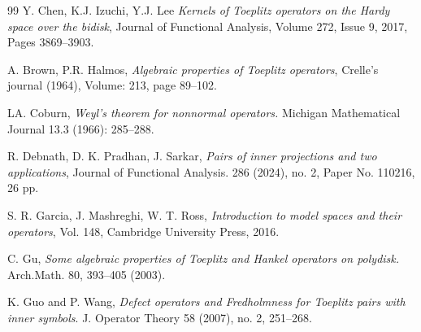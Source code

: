 \documentclass[12pt, a4 paper]{amsart}
\theoremstyle{definition}
\theoremstyle{plain}
\theoremstyle{definition}
\numberwithin{equation}{section}
\begin{document}
\begin{thebibliography}{99}
Y. Chen, K.J. Izuchi, Y.J. Lee
\emph{Kernels of Toeplitz operators on the Hardy space over the bidisk}, Journal of Functional Analysis, Volume 272, Issue 9,
2017, Pages 3869--3903.


A. Brown, P.R. Halmos, 
\emph{Algebraic properties of Toeplitz operators}, Crelle's journal (1964), Volume: 213, page 89--102.

LA. Coburn, 
\emph{Weyl's theorem for nonnormal operators. } Michigan Mathematical Journal 13.3 (1966): 285--288.




R. Debnath, D. K. Pradhan, J. Sarkar, 
\emph{Pairs of inner projections and
two applications},  Journal of Functional Analysis. 286 (2024), no. 2, Paper No. 110216, 26 pp. 



S. R. Garcia, J. Mashreghi, W. T. Ross, 
\emph{Introduction to model spaces
and their operators}, Vol. 148, Cambridge University Press, 2016.


C. Gu, 
\emph{Some algebraic properties of Toeplitz and Hankel operators on polydisk.} Arch.Math. 80, 393--405 (2003). 

K. Guo and P. Wang,
\emph{Defect operators and Fredholmness for Toeplitz pairs with inner symbols}. J. Operator Theory 58 (2007), no. 2, 251--268.



\end{thebibliography}
\end{document}
